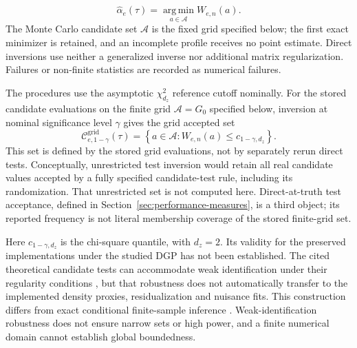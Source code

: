 \begin{equation}
    \widehat\alpha_e(\tau)
    =
    \operatorname*{arg\,min}_{a\in\mathcal A}W_{e,n}(a).
    \label{eq:gmm-point-estimator}
\end{equation}
The Monte Carlo candidate set $\mathcal A$ is the fixed grid specified below; the first exact minimizer is retained, and an incomplete profile receives no point estimate. Direct inversions use neither a generalized inverse nor additional matrix regularization. Failures or non-finite statistics are recorded as numerical failures.

The procedures use the asymptotic $\chi^2_{d_z}$ reference cutoff nominally. For the stored candidate evaluations on the finite grid $\mathcal A=G_0$ specified below, inversion at nominal significance level $\gamma$ gives the grid accepted set
\begin{equation}
    \mathcal C^{\mathrm{grid}}_{e,1-\gamma}(\tau)
    =
    \left\{
        a\in\mathcal A:
        W_{e,n}(a)\leq c_{1-\gamma,d_z}
    \right\}.
    \label{eq:robust-confidence-region}
\end{equation}
This set is defined by the stored grid evaluations, not by separately rerun direct tests. Conceptually, unrestricted test inversion would retain all real candidate values accepted by a fully specified candidate-test rule, including its randomization. That unrestricted set is not computed here. Direct-at-truth test acceptance, defined in Section~\ref{sec:performance-measures}, is a third object; its reported frequency is not literal membership coverage of the stored finite-grid set.

Here $c_{1-\gamma,d_z}$ is the chi-square quantile, with $d_z=2$. Its validity for the preserved implementations under the studied DGP has not been established. The cited theoretical candidate tests can accommodate weak identification under their regularity conditions \parencite{chernozhukov_hansen_2008}, but that robustness does not automatically transfer to the implemented density proxies, residualization and nuisance fits. This construction differs from exact conditional finite-sample inference \parencite{chernozhukov_hansen_jansson_2009}. Weak-identification robustness does not ensure narrow sets or high power, and a finite numerical domain cannot establish global boundedness.

